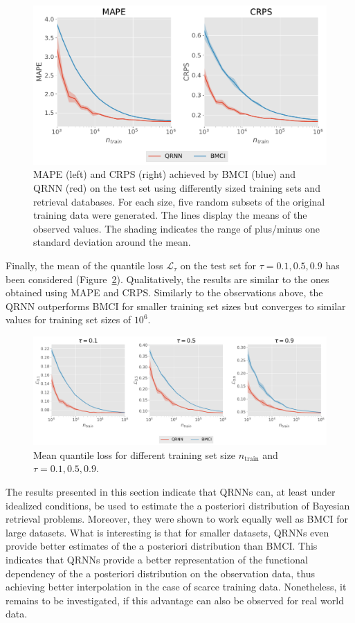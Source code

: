 \documentclass[journal abbreviation, manuscript]{copernicus}
\begin{document}
  \begin{figure}[hbpt!]
    \includegraphics[width = 0.5\linewidth]{../plots/mape_crps}
    \caption{MAPE (left) and CRPS (right) achieved by BMCI (blue) and QRNN (red)
      on the test set using differently sized training sets and retrieval
    databases. For each size, five random subsets of the original training data were
    generated. The lines display the means of the observed values. The shading
    indicates the range of plus/minus one standard deviation around the mean.}
    \label{fig:mape_crps}
  \end{figure}

Finally, the mean of the quantile loss $\mathcal{L}_\tau$ on the test set for
$\tau = 0.1, 0.5, 0.9$ has been considered (Figure~\ref{fig:quantile_losses}).
Qualitatively, the results are similar to the ones obtained using MAPE and CRPS.
Similarly to the observations above, the QRNN outperforms BMCI for smaller
 training set sizes but converges to similar values for training set sizes
 of $10^6$.

  \begin{figure}[hbpt!]
    \centering
    \includegraphics[width = 0.8\linewidth]{../plots/quantile_losses}
    \caption{Mean quantile loss for different training set size $n_\text{train}$ and
    $\tau = 0.1, 0.5, 0.9$.}
    \label{fig:quantile_losses}
  \end{figure}

The results presented in this section indicate that QRNNs can, at least
under idealized conditions, be used to estimate the a posteriori distribution of 
Bayesian retrieval problems. Moreover, they were shown to work equally well
as BMCI for large datasets. What is interesting is that for smaller datasets,
QRNNs even provide better estimates of the a posteriori distribution than BMCI.
This indicates that QRNNs provide a better representation of the functional
dependency of the a posteriori distribution on the observation data, thus
achieving better interpolation in the case of scarce training data. Nonetheless,
 it remains to be investigated, if this advantage can also be observed for real
world data.
\end{document}
